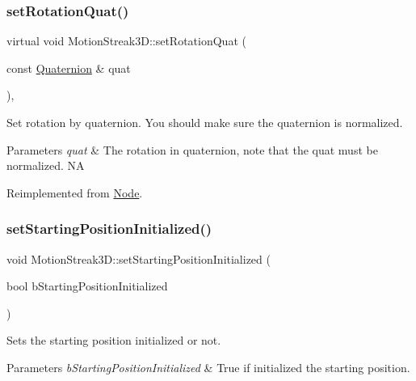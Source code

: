 \subsubsection{\texorpdfstring{set\+Rotation\+Quat()}{setRotationQuat()}\hspace{0.1cm}{\footnotesize\ttfamily [2/2]}}
{\footnotesize\ttfamily virtual void Motion\+Streak3\+D\+::set\+Rotation\+Quat (\begin{DoxyParamCaption}\item[{const \hyperlink{classQuaternion}{Quaternion} \&}]{quat }\end{DoxyParamCaption})\hspace{0.3cm}{\ttfamily [override]}, {\ttfamily [virtual]}}

Set rotation by quaternion. You should make sure the quaternion is normalized.


\begin{DoxyParams}{Parameters}
{\em quat} & The rotation in quaternion, note that the quat must be normalized.  NA \\
\hline
\end{DoxyParams}


Reimplemented from \hyperlink{classNode_a59c0b9e9afc4668320d90c340e5727e7}{Node}.

\mbox{\label{classMotionStreak3D_a62b248c1dd60a576a0a471da62e3b5de}} 
\subsubsection{\texorpdfstring{set\+Starting\+Position\+Initialized()}{setStartingPositionInitialized()}\hspace{0.1cm}{\footnotesize\ttfamily [1/2]}}
{\footnotesize\ttfamily void Motion\+Streak3\+D\+::set\+Starting\+Position\+Initialized (\begin{DoxyParamCaption}\item[{bool}]{b\+Starting\+Position\+Initialized }\end{DoxyParamCaption})\hspace{0.3cm}{\ttfamily [inline]}}

Sets the starting position initialized or not.


\begin{DoxyParams}{Parameters}
{\em b\+Starting\+Position\+Initialized} & True if initialized the starting position. \\
\hline
\end{DoxyParams}
\mbox{\label{classMotionStreak3D_a62b248c1dd60a576a0a471da62e3b5de}} 
